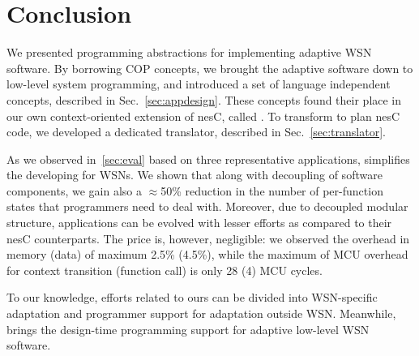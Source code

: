 \section{Conclusion}\label{sec:ending}

We presented programming abstractions for implementing adaptive WSN software. By
borrowing COP concepts, we brought the adaptive software down to low-level
system programming, and introduced a set of language independent concepts,
described in Sec.~\ref{sec:appdesign}. These concepts found their place in our
own context-oriented extension of nesC, called \conesc. To transform \conesc to
plan nesC code, we developed a dedicated translator, described in
Sec.~\ref{sec:translator}.

As we observed in~\ref{sec:eval} based on three representative applications,
\conesc simplifies the developing for WSNs. We shown that along with decoupling
of software components, we gain also a $\approx$50\% reduction in the number of
per-function states that programmers need to deal with. Moreover, due to
decoupled modular structure, \conesc applications can be evolved with lesser
efforts as compared to their nesC counterparts. The price is, however,
negligible: we observed the overhead in memory (data) of maximum 2.5\% (4.5\%),
while the maximum of MCU overhead for context transition (function call) is only
28 (4) MCU cycles.

To our knowledge, efforts related to ours can be divided into WSN-specific
adaptation and programmer support for adaptation outside WSN. Meanwhile, \conesc
brings the design-time programming support for adaptive low-level WSN software.

